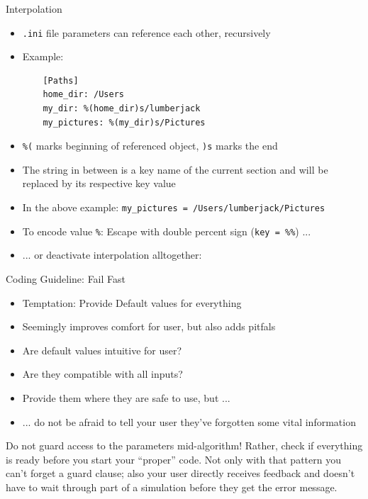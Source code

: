 \begin{frame}[fragile]{Interpolation}
%
\begin{itemize}
\item \texttt{.ini} file parameters can reference each other, recursively
\item Example:
	\begin{verbatim}
	[Paths]
	home_dir: /Users
	my_dir: %(home_dir)s/lumberjack
	my_pictures: %(my_dir)s/Pictures
	\end{verbatim}
\item \texttt{\%(} marks beginning of referenced object, \texttt{)s} marks the end
\item The string in between is a key name of the current section and will be replaced by its respective key value
\item In the above example: \texttt{my\_pictures = /Users/lumberjack/Pictures}
\item To encode value \texttt{\%}: Escape with double percent sign (\texttt{key = \%\%}) ...
\item ... or deactivate interpolation alltogether: \\
\end{itemize}
%
\end{frame}


\begin{frame}{Coding Guideline: Fail Fast}
%
\begin{itemize}
\item Temptation: Provide Default values for everything
\item Seemingly improves comfort for user, but also adds pitfals
\item Are default values intuitive for user?
\item Are they compatible with all inputs?
\item[\Thus] Provide them where they are safe to use, but ...
\item[\Thus] ... do not be afraid to tell your user they've forgotten some vital information
\end{itemize}
%
\begin{hintbox}
\footnotesize
Do not guard access to the parameters mid-algorithm! Rather, check if everything is ready before you start your \enquote{proper} code. Not only with that pattern you can't forget a guard clause; also your user directly receives feedback and doesn't have to wait through part of a simulation before they get the error message.
\end{hintbox}
%
\end{frame}
